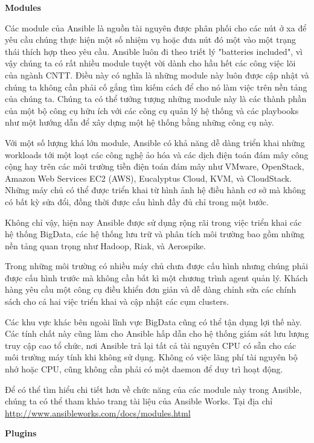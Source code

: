 \textbf{\large Modules}


Các module của Ansible là nguồn tài nguyên được phân phối cho các nút ở xa để yêu cầu chúng thực hiện một số nhiệm vụ hoặc đưa nút đó một vào một trạng thái thích hợp theo yêu cầu. Ansible luôn đi theo triết lý "batteries included", vì vậy chúng ta có rất nhiều module tuyệt vời dành cho hầu hết các công việc lõi của ngành CNTT. Điều này có nghĩa là những module này luôn được cập nhật và chúng ta không cần phải cố gắng tìm kiếm cách để cho nó làm việc trên nền tảng của chúng ta. Chúng ta có thể tưởng tượng những module này là các thành phần của một bộ công cụ hữu ích với các công cụ quản lý hệ thống và các playbooks như một hướng dẫn để xây dựng một hệ thống bằng những công cụ này.

Với một số lượng khá lớn module, Ansible có khả năng dễ dàng triển khai những workloads tới một loạt các công nghệ ảo hóa và các dịch điện toán đám mây công cộng hay trên các môi trường tiền điện toán đám mây như VMware, OpenStack, Amazon Web Services EC2 (AWS), Eucalyptus Cloud, KVM, và CloudStack. Những máy chủ có thể được triển khai từ hình ảnh hệ điều hành cơ sở mà không có bất kỳ sửa đổi, đồng thời được cấu hình đầy đủ chỉ trong một bước.

Không chỉ vậy, hiện nay Ansible được sử dụng rộng rãi trong việc triển khai các hệ thống BigData, các hệ thống lưu trữ và phân tích môi trường bao gồm những nền tảng quan trọng như Hadoop, Riak, và Aerospike.

Trong những môi trường có nhiều máy chủ chưa được cấu hình nhưng chúng phải được cấu hình trước mà không cần bất kì một chương trình agent quản lý. Khách hàng yêu cầu một công cụ điều khiển đơn giản và dễ dàng chỉnh sửa các chính sách cho cả hai việc triển khai và cập nhật các cụm clusters.

Các khu vực khác bên ngoài lĩnh vực BigData cũng có thể tận dụng lợi thế này. Các tính chất này cũng làm cho Ansible hấp dẫn cho hệ thống giám sát lưu lượng truy cập cao tổ chức, nơi Ansible trả lại tất cả tài nguyên CPU có sẵn cho các môi trường máy tính khi không sử dụng. Không có việc lãng phí tài nguyên bộ nhớ hoặc CPU, cũng không cần phải có một daemon để duy trì hoạt động.

Để có thể tìm hiểu chi tiết hơn về chức năng của các module này trong Ansible, chúng ta có thể tham khảo trang tài liệu của Ansible Works. Tại địa chỉ \url{http://www.ansibleworks.com/docs/modules.html}

\textbf{\large Plugins}


